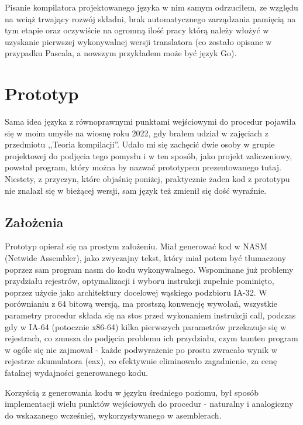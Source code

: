 Pisanie kompilatora projektowanego języka w nim samym odrzuciłem, ze względu na wciąż trwający rozwój składni, brak automatycznego zarządzania pamięcią na tym etapie oraz oczywiście na ogromną ilość pracy którą należy włożyć w uzyskanie pierwszej wykonywalnej wersji translatora (co zostało opisane w przypadku Pascala, a nowszym przykładem może być język Go).

\section{Prototyp}
Sama idea języka z równoprawnymi punktami wejściowymi do procedur pojawiła się w moim umyśle na wiosnę roku 2022, gdy brałem udział w zajęciach z przedmiotu ,,Teoria kompilacji''. Udało mi się zachęcić dwie osoby w grupie projektowej do podjęcia tego pomysłu i w ten sposób, jako projekt zaliczeniowy, powstał program, który można by nazwać prototypem prezentowanego tutaj. Niestety, z przyczyn, które objaśnię poniżej, praktycznie żaden kod z prototypu nie znalazł się w bieżącej wersji, sam język też zmienił się dość wyraźnie.

\subsection{Założenia}
Prototyp opierał się na prostym założeniu. Miał generować kod w NASM (Netwide Assembler), jako zwyczajny tekst, który miał potem być tłumaczony poprzez sam program nasm do kodu wykonywalnego. Wspominane już problemy przydziału rejestrów, optymalizacji i wyboru instrukcji zupełnie pominięto, poprzez użycie jako architektury docelowej wąskiego podzbioru IA-32. W porównianiu z 64 bitową wersją, ma prostszą konwencję wywołań, wszystkie parametry procedur składa się na stos przed wykonaniem instrukcji call, podczas gdy w IA-64 (potocznie x86-64) kilka pierwszych parametrów przekazuje się w rejestrach, co zmusza do podjęcia problemu ich przydziału, czym tamten program w ogóle się nie zajmował - każde podwyrażenie po prostu zwracało wynik w rejestrze akumulatora (eax), co efektywnie eliminowało zagadnienie, za cenę fatalnej wydajności generowanego kodu. 

Korzyścią z generowania kodu w języku średniego poziomu, był sposób implementacji wielu punktów wejściowych do procedur - naturalny i analogiczny do wskazanego wcześniej, wykorzystywanego w asemblerach.

